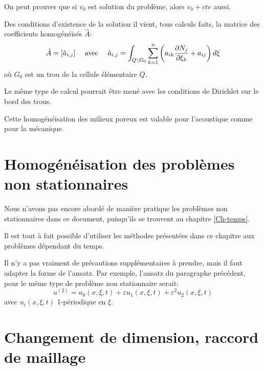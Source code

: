 On peut prouver que si $v_0$ est solution du problème, alors $v_0+cte$ aussi.

\medskip
Des conditions d'existence de la solution il vient, tous calculs faits, la matrice des
coefficients homogénéisés $\hat{A}$:
\begin{equation} \hat{A} = [\hat{a}_{i,j} ]
\quad \text{ avec }
\quad
\hat{a}_{i,j}=\displaystyle\int_{Q\backslash G_0} \displaystyle\sum_{k=1}^n \left(a_{ik} \frac{\partial N_j}{\partial\xi_k} + a_{ij}
\right) d\xi
\end{equation}
où $G_0$ est un trou de la cellule élémentaire $Q$.


\medskip
Le même type de calcul pourrait être mené avec les conditions de Dirichlet sur le bord
des trous.

\medskip
Cette homogénéisation des milieux poreux est valable pour l'acoustique comme pour la mécanique.



\medskip
\section{Homogénéisation des problèmes non stationnaires}

Nous n'avons pas encore abordé de manière pratique les problèmes non stationnaires
dans ce document, puisqu'ils se trouvent au chapitre \ref{Ch-temps}.

Il est tout à fait possible d'utiliser les méthodes présentées dans ce chapitre
aux problèmes dépendant du temps.

Il n'y a pas vraiment de précautions supplémentaires à prendre, mais il faut adapter
la forme de l'ansatz.
Par exemple, l'ansatz du paragraphe précédent, pour le même type de problème
non stationnaire serait:
\begin{equation}u^{(2)} = u_0(x,\xi,t)+\varepsilon u_1(x,\xi,t) + \varepsilon^2 u_2(x,\xi,t)\end{equation}
avec $u_i(x,\xi,t)$ 1-périodique en $\xi$.





\medskip
\section{Changement de dimension, raccord de maillage}


